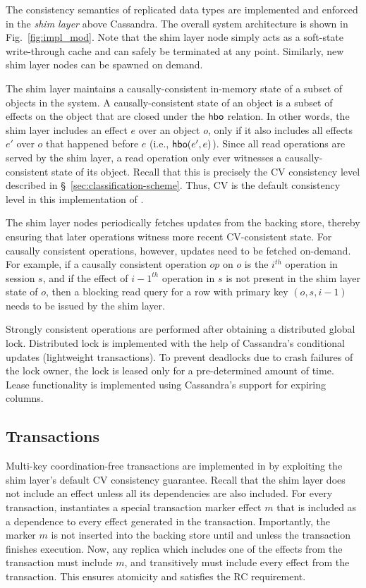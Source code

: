 The consistency semantics of replicated data types are implemented and
enforced in the \emph{shim layer} above Cassandra. The overall system
architecture is shown in Fig.~\ref{fig:impl_mod}. Note that the shim
layer node simply acts as a soft-state write-through cache and can
safely be terminated at any point. Similarly, new shim layer nodes can
be spawned on demand.

The shim layer maintains a causally-consistent
 in-memory state of a subset of objects in the system.
A causally-consistent state of an object is a subset of effects on the
object that are closed under the ${\normalfont \textsf{hbo}}$ relation. In other words,
the shim layer includes an effect $e$ over an object $o$, only if it
also includes all effects $e'$ over $o$ that happened before $e$ (i.e.,
${\normalfont \textsf{hbo}(e',e)}$). Since all read operations are served by the shim
layer, a read operation only ever witnesses a causally-consistent state of its
object. Recall that this is precisely the CV consistency level
described in \S~\ref{sec:classification-scheme}. Thus, CV is the
default consistency level in this implementation of \name.

The shim layer nodes periodically fetches updates from the backing
store, thereby ensuring that later operations witness more recent
CV-consistent state. For causally consistent operations, however,
updates need to be fetched on-demand. For example, if a causally
consistent operation $op$ on $o$ is the $i^{th}$ operation in session
$s$, and if the effect of ${i-1}^{th}$ operation in $s$ is not present
in the shim layer state of $o$, then a blocking read query for a row
with primary key $(o,s,i-1)$ needs to be issued by the shim layer.

Strongly consistent operations are performed after obtaining a
distributed global lock. Distributed lock is implemented with the
help of Cassandra's conditional updates (lightweight transactions). To
prevent deadlocks due to crash failures of the lock owner, the lock is
leased only for a pre-determined amount of time. Lease functionality
is implemented using Cassandra's support for expiring columns.

\subsection{Transactions}

Multi-key coordination-free transactions are implemented in \name by
exploiting the shim layer's default CV consistency guarantee. Recall that
the shim layer does not include an effect unless all its
dependencies are also included. For every transaction, \name
instantiates a special transaction marker effect $m$ that is
included as a dependence to every effect generated in the transaction.
Importantly, the marker $m$ is not inserted into the backing store
until and unless the transaction finishes execution. Now, any replica
which includes one of the effects from the transaction must include
$m$, and transitively must include every effect from the transaction.
This ensures atomicity and satisfies the RC requirement.

